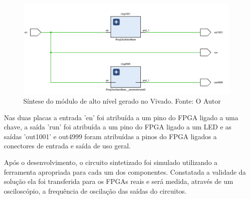 \begin{figure}[H]
    \centering
    \includegraphics[width=\linewidth]{figures/Metodologia/ZedBoard_RTL_Schematic.png}
    \caption{Síntese do módulo de alto nível gerado no Vivado. Fonte: O Autor}
    \label{fig:ZedRtlSchem1}
\end{figure}

Nas duas placas a entrada 'en' foi atribuída a um pino do FPGA ligado a uma chave, a saída 'run' foi atribuída a um pino do FPGA ligado a um LED e as saídas 'out1001' e out4999 foram atribuídas a pinos do FPGA ligados a conectores de entrada e saída de uso geral.

Após o desenvolvimento, o circuito sintetizado foi simulado utilizando a ferramenta apropriada para cada um dos componentes. Constatada a validade da solução ela foi transferida para os FPGAs reais e será medida, através de um osciloscópio, a frequência de oscilação das saídas do circuitos.